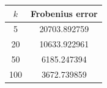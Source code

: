 \begin{tabular}[12pt]{ |c| c| }
    \hline
    {$k$} & {Frobenius error}\\ 
    \hline
    5 &   20703.892759\\
    \hline
    20 &  10633.922961 \\
    \hline
    50 &  6185.247394 \\
    \hline
    100 & 3672.739859 \\
    \hline
\end{tabular}
